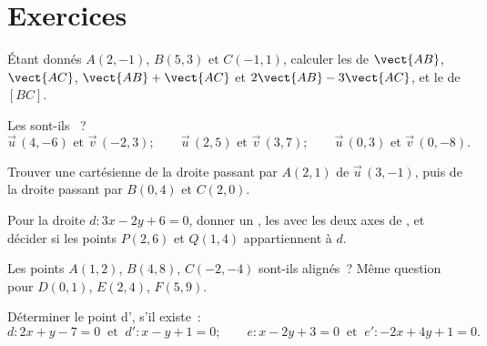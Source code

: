 \section{Exercices}

\begin{exercise}[$\star$]\label{exo:g11:vect:1}
Étant donnés $A(2, -1)$, $B(5, 3)$ et $C(-1, 1)$, calculer les
 de $\vect{AB}$, $\vect{AC}$, $\vect{AB} + \vect{AC}$ et
$2\vect{AB} - 3\vect{AC}$, et le  de $[BC]$.
\end{exercise}

\begin{exercise}[$\star$]\label{exo:g11:vect:2}
Les  sont-ils ~?
\[
\vec u\,(4, -6) \text{ et } \vec v\,(-2, 3); \qquad
\vec u\,(2, 5) \text{ et } \vec v\,(3, 7); \qquad
\vec u\,(0, 3) \text{ et } \vec v\,(0, -8).
\]
\end{exercise}

\begin{exercise}[$\star$]\label{exo:g11:vect:3}
Trouver une  cartésienne de la droite passant par $A(2, 1)$ de
 $\vec u\,(3, -1)$, puis de la droite passant par
$B(0, 4)$ et $C(2, 0)$.
\end{exercise}

\begin{exercise}[$\star$]\label{exo:g11:vect:4}
Pour la droite $d: 3x - 2y + 6 = 0$, donner un , les
 avec les deux axes de , et décider si les points
$P(2, 6)$ et $Q(1, 4)$ appartiennent à $d$.
\end{exercise}

\begin{exercise}[$\star\star$]\label{exo:g11:vect:5}
Les points $A(1, 2)$, $B(4, 8)$, $C(-2, -4)$ sont-ils alignés~? Même
question pour $D(0, 1)$, $E(2, 4)$, $F(5, 9)$.
\end{exercise}

\begin{exercise}[$\star\star$]\label{exo:g11:vect:6}
Déterminer le point d', s'il existe~:
\[
d: 2x + y - 7 = 0 \ \text{ et }\ d': x - y + 1 = 0;
\qquad
e: x - 2y + 3 = 0 \ \text{ et }\ e': -2x + 4y + 1 = 0 .
\]
\end{exercise}

